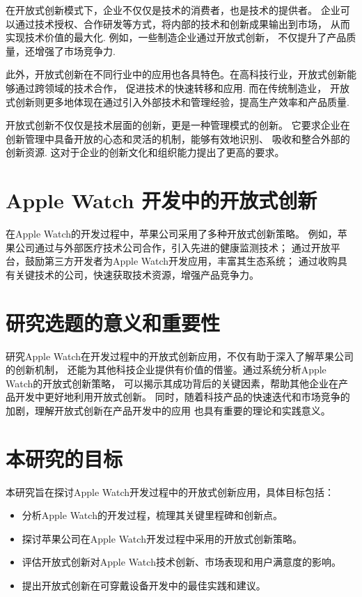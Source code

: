 在开放式创新模式下，企业不仅仅是技术的消费者，也是技术的提供者。
企业可以通过技术授权、合作研发等方式，将内部的技术和创新成果输出到市场，
从而实现技术价值的最大化\citep{lu_chanpinzhiliang_2021}. 例如，一些制造企业通过开放式创新，
不仅提升了产品质量，还增强了市场竞争力\citep{han_xinchanpin_2021}.

此外，开放式创新在不同行业中的应用也各具特色。在高科技行业，开放式创新能够通过跨领域的技术合作，
促进技术的快速转移和应用\citep{dong_gongyinglian_2024}. 而在传统制造业，
开放式创新则更多地体现在通过引入外部技术和管理经验，提高生产效率和产品质量\citep{sun_neiwiajianxiu_2024}.

开放式创新不仅仅是技术层面的创新，更是一种管理模式的创新。
它要求企业在创新管理中具备开放的心态和灵活的机制，能够有效地识别、
吸收和整合外部的创新资源\citep{zhang_shizheng_2012}.
 这对于企业的创新文化和组织能力提出了更高的要求。


\section{Apple Watch 开发中的开放式创新}

在Apple Watch的开发过程中，苹果公司采用了多种开放式创新策略。
例如，苹果公司通过与外部医疗技术公司合作，引入先进的健康监测技术；
通过开放平台，鼓励第三方开发者为Apple Watch开发应用，丰富其生态系统；
通过收购具有关键技术的公司，快速获取技术资源，增强产品竞争力\citep{apple2024,davidson_assessing_2023}。

\section{研究选题的意义和重要性}

研究Apple Watch在开发过程中的开放式创新应用，不仅有助于深入了解苹果公司的创新机制，
还能为其他科技企业提供有价值的借鉴。通过系统分析Apple Watch的开放式创新策略，
可以揭示其成功背后的关键因素，帮助其他企业在产品开发中更好地利用开放式创新。
同时，随着科技产品的快速迭代和市场竞争的加剧，理解开放式创新在产品开发中的应用
也具有重要的理论和实践意义\citep{gehani2016corporate,chesbrough2022}。

\section{本研究的目标}

本研究旨在探讨Apple Watch开发过程中的开放式创新应用，具体目标包括：
\begin{itemize}
    \item 分析Apple Watch的开发过程，梳理其关键里程碑和创新点。
    \item 探讨苹果公司在Apple Watch开发过程中采用的开放式创新策略。
    \item 评估开放式创新对Apple Watch技术创新、市场表现和用户满意度的影响。
    \item 提出开放式创新在可穿戴设备开发中的最佳实践和建议。
\end{itemize}